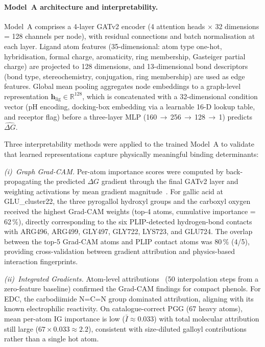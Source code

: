 \documentclass[11pt]{article}
\begin{document}
\paragraph{Model~A architecture and interpretability.}
Model~A comprises a 4-layer GATv2 encoder (4 attention heads $\times$
32 dimensions = 128 channels per node), with residual connections and
batch normalisation at each layer.  Ligand atom features (35-dimensional:
atom type one-hot, hybridisation, formal charge, aromaticity, ring
membership, Gasteiger partial charge) are projected to 128 dimensions,
and 13-dimensional bond descriptors (bond type, stereochemistry,
conjugation, ring membership) are used as edge features.  Global mean
pooling aggregates node embeddings to a graph-level representation
$\mathbf{h}_{\text{lig}} \in \mathbb{R}^{128}$, which is concatenated
with a 32-dimensional condition vector (pH encoding, docking-box
embedding via a learnable 16-D lookup table, and receptor flag) before
a three-layer MLP (160\,$\to$\,256\,$\to$\,128\,$\to$\,1) predicts
$\hat{\Delta G}$.

Three interpretability methods were applied to the trained Model~A to
validate that learned representations capture physically meaningful
binding determinants:

\emph{(i)~Graph Grad-CAM.}  Per-atom importance scores were computed by
back-propagating the predicted $\Delta G$ gradient through the final GATv2
layer and weighting activations by mean gradient magnitude~\cite{selvaraju2017grad}.
For gallic acid at GLU\_cluster22, the three
pyrogallol hydroxyl groups and the carboxyl oxygen received the highest
Grad-CAM weights (top-4 atoms, cumulative importance = 62\,\%), directly
corresponding to the six PLIP-detected hydrogen-bond contacts with ARG496,
ARG499, GLY497, GLY722, LYS723, and GLU724.  The overlap between the
top-5 Grad-CAM atoms and PLIP contact atoms was 80\,\% (4/5), providing
cross-validation between gradient attribution and physics-based interaction
fingerprints.

\emph{(ii)~Integrated Gradients.}  Atom-level attributions~\cite{sundararajan2017axiomatic}
(50 interpolation steps from a zero-feature baseline) confirmed
the Grad-CAM findings for compact phenols.
For EDC, the carbodiimide N=C=N group dominated attribution,
aligning with its known electrophilic reactivity.
On catalogue-correct PGG (67 heavy atoms), mean per-atom IG importance
is low ($\bar{I} \approx 0.033$) with total molecular attribution
still large ($67 \times 0.033 \approx 2.2$), consistent with
size-diluted galloyl contributions rather than a single hot atom.
\end{document}
